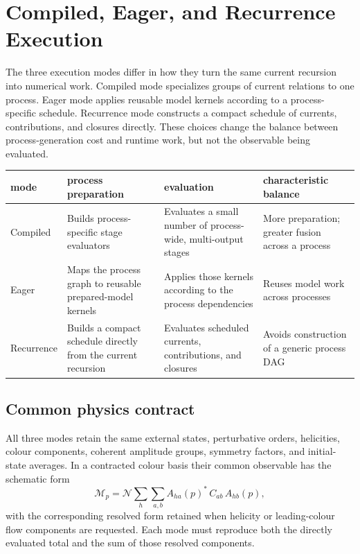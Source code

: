 \section{Compiled, Eager, and Recurrence Execution}
\label{sec:eager-execution}

The three execution modes differ in how they turn the same current recursion
into numerical work. Compiled mode specializes groups of current relations to
one process. Eager mode applies reusable model kernels according to a
process-specific schedule. Recurrence mode constructs a compact schedule of
currents, contributions, and closures directly. These choices change the
balance between process-generation cost and runtime work, but not the
observable being evaluated.

\begin{center}
\small
\begin{tabular}{@{}L{0.72in}L{1.85in}L{2.00in}L{1.40in}@{}}
\toprule
\textbf{mode} & \textbf{process preparation} & \textbf{evaluation} &
  \textbf{characteristic balance} \\
\midrule
Compiled
  & Builds process-specific stage evaluators
  & Evaluates a small number of process-wide, multi-output stages
  & More preparation; greater fusion across a process \\
Eager
  & Maps the process graph to reusable prepared-model kernels
  & Applies those kernels according to the process dependencies
  & Reuses model work across processes \\
Recurrence
  & Builds a compact schedule directly from the current recursion
  & Evaluates scheduled currents, contributions, and closures
  & Avoids construction of a generic process DAG \\
\bottomrule
\end{tabular}
\end{center}

\subsection{Common physics contract}

All three modes retain the same external states, perturbative orders,
helicities, colour components, coherent amplitude groups, symmetry factors,
and initial-state averages. In a contracted colour basis their common
observable has the schematic form
\begin{equation}
  \mathcal M_p
  =\mathcal N\sum_h\sum_{a,b}
    A_{ha}(p)^{*}\,C_{ab}\,A_{hb}(p),
  \label{eq:three-mode-common-observable}
\end{equation}
with the corresponding resolved form retained when helicity or leading-colour
flow components are requested. Each mode must reproduce both the directly
evaluated total and the sum of those resolved components.


